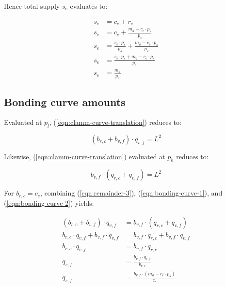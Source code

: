 \documentclass[table, twocolumn]{article}
\begin{document}
Hence total supply $s_e$ evaluates to:

\begin{align} \label{eqn:remainder-6}
  s_e & = c_e + r_e \nonumber                                                   \\
  s_e & = c_e + \frac{m_a - c_e \cdot p_s}{p_s} \nonumber                       \\
  s_e & = \frac{c_e \cdot p_s}{p_s} + \frac{m_a - c_e \cdot p_s}{p_s} \nonumber \\
  s_e & = \frac{c_e \cdot p_s + m_a - c_e \cdot p_s}{p_s} \nonumber             \\
  s_e & = \frac{m_a}{p_s}
\end{align}

\subsection{Bonding curve amounts} \label{sec:bonding-curve-constraints}

Evaluated at $p_l$, (\ref{eqn:clamm-curve-translation}) reduces to:

\begin{equation} \label{eqn:bonding-curve-1}
  (b_{r, c} + b_{v, f}) \cdot q_{v, f} = L^2
\end{equation}

Likewise, (\ref{eqn:clamm-curve-translation}) evaluated at $p_h$ reduces to:

\begin{equation} \label{eqn:bonding-curve-2}
  b_{v, f} \cdot (q_{r, c} + q_{v, f}) = L^2
\end{equation}

For $b_{r, c} = c_e$, combining (\ref{eqn:remainder-3}),
(\ref{eqn:bonding-curve-1}), and (\ref{eqn:bonding-curve-2}) yields:

\begin{align} \label{eqn:bonding-curve-3}
  (b_{r, c} + b_{v, f}) \cdot q_{v, f}              & =
  b_{v, f} \cdot (q_{r, c} + q_{v, f}) \nonumber              \\
  b_{r, c} \cdot q_{v, f} + b_{v, f} \cdot q_{v, f} & =
  b_{v, f} \cdot q_{r, c} + b_{v, f} \cdot q_{v, f} \nonumber \\
  b_{r, c} \cdot q_{v, f}                           & =
  b_{v, f} \cdot q_{r, c} \nonumber                           \\
  q_{v, f}                                          & =
  \frac{b_{v, f} \cdot q_{r, c}}{b_{r, c}} \nonumber          \\
  q_{v, f}                                          & =
  \frac{b_{v, f} \cdot (m_a - c_e \cdot p_s)}{c_e}
\end{align}
\end{document}
